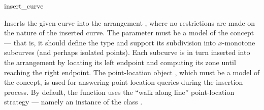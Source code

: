
\ccRefPageBegin

\begin{ccRefFunction}{insert_curve}


   {Inserts the given curve  into the arrangement , where
    no restrictions are made on the nature of the inserted curve.
    The  parameter must be a model of the
    concept --- that is, it should define the  type and support
    its subdivision into $x$-monotone subcurves (and perhaps isolated points).
    Each subcurve is in turn inserted into the arrangement by locating its
    left endpoint and computing its zone until reaching the right endpoint.
    The point-location object , which must be a model of the
     concept, is used for answering
    point-location queries during the insertion process.
    By default, the function uses the ``walk along line'' point-location
    strategy --- namely an instance of the class
    .
    }


\end{ccRefFunction}

\ccRefPageEnd
